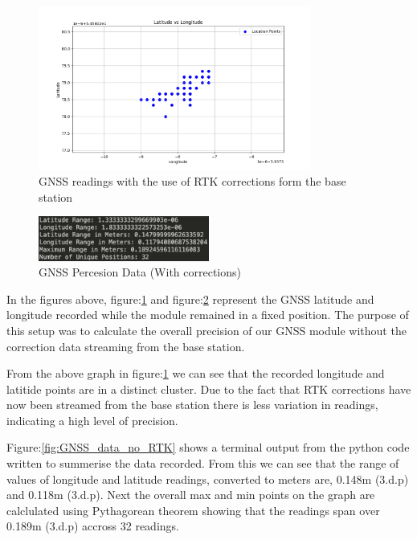 \documentclass{article}
\begin{document}
\begin{figure}[H]
  \centering
  \includegraphics[width=0.8\textwidth]{Pictures/GNSS_RTK.png}
  \caption{GNSS readings with the use of RTK corrections form the base station}
  \label{fig:GNSS_RTK}
\end{figure}

\begin{figure}[H]
  \centering
  \includegraphics[width=0.5\textwidth]{Pictures/GNSS_data_correction.png}
  \caption{GNSS Percesion Data (With corrections)}
  \label{fig:GNSS_data_RTK}
\end{figure}

In the figures above, figure:\ref{fig:GNSS_RTK} and
figure:\ref{fig:GNSS_data_RTK} represent the GNSS latitude and longitude
recorded while the module remained in a fixed position. The purpose of this
setup was to calculate the overall precision of our GNSS module without the
correction data streaming from the base station.

From the above graph in figure:\ref{fig:GNSS_RTK} we can see that the recorded
longitude and latitide points are in a distinct cluster. Due to the fact that
RTK corrections have now been streamed from the base station there is less
variation in readings, indicating a high level of precision.

Figure:\ref{fig:GNSS_data_no_RTK} shows a terminal output from the python code
written to summerise the data recorded. From this we can see that the range of
values of longitude and latitude readings, converted to meters are, 0.148m
(3.d.p) and  0.118m (3.d.p). Next the overall max and min points on the graph
are calclulated using Pythagorean theorem showing that the readings span over
0.189m (3.d.p) accross 32 readings.
\end{document}
